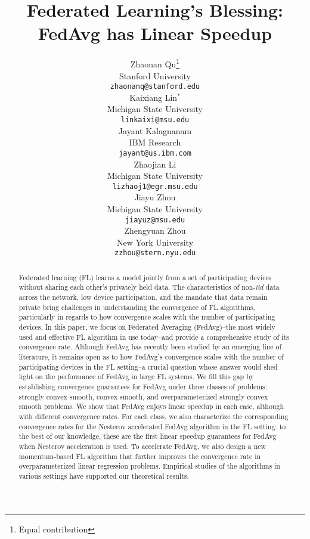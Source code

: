 \documentclass{article}
\title{Federated Learning's Blessing:\\
FedAvg has Linear Speedup}
\author{%
  Zhaonan Qu\thanks{Equal contribution} \\
 Stanford University\\
  \texttt{zhaonanq@stanford.edu} \\
  \And
  Kaixiang Lin$^*$ \\
  Michigan State University \\
  \texttt{linkaixi@msu.edu} \\
  \AND
  Jayant Kalagnanam \\
  IBM Research \\
  \texttt{jayant@us.ibm.com} \\
  \And
  Zhaojian Li \\
  Michigan State University \\
  \texttt{lizhaoj1@egr.msu.edu} \\
  \And
  Jiayu Zhou\\
  Michigan State University \\
  \texttt{jiayuz@msu.edu} \\
  \And
  Zhengyuan Zhou\\
  New York University \\
  \texttt{zzhou@stern.nyu.edu} \\
}
\begin{document}
\maketitle

\begin{abstract}
Federated learning (FL) learns a model jointly from a set of participating devices without sharing each other's privately held data. The characteristics of non-\textit{iid} data across the network, low device participation, and the mandate that data remain private bring challenges in understanding the convergence of FL algorithms, particularly in regards to how convergence scales with the number of participating devices. In this paper, we focus on Federated Averaging (FedAvg)--the most widely used and effective FL algorithm in use today--and provide a comprehensive study of its convergence rate. Although FedAvg has recently been studied by an emerging line of literature, it remains open as to how FedAvg's convergence scales with the number of participating devices in the FL setting--a crucial question whose answer would shed light on the performance of FedAvg in large FL systems. We fill this gap by establishing convergence guarantees for FedAvg under three classes of problems: strongly convex smooth, convex smooth, and overparameterized strongly convex smooth problems. We show that FedAvg enjoys linear speedup in each case, although with different convergence rates. For each class, we also characterize the corresponding convergence rates for the Nesterov accelerated FedAvg algorithm in the FL setting: to the best of our knowledge, these are the first linear speedup guarantees for FedAvg when Nesterov acceleration is used. To accelerate FedAvg, we also design a new momentum-based FL algorithm that further improves the convergence rate in overparameterized linear regression problems. Empirical studies of the algorithms in various settings have supported our theoretical results.
\end{abstract}


%






% 



% 
\newpage



\newpage
\appendix

\end{document}
